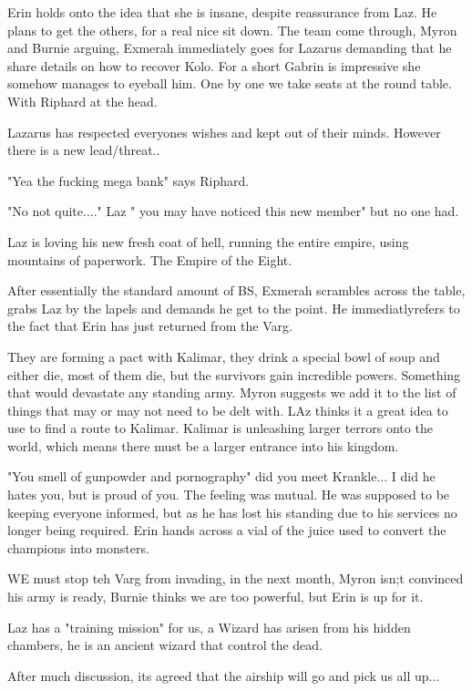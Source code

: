 Erin holds onto the idea that she is insane, despite reassurance from Laz. He plans to get the others, for a real nice sit down. The team come through, Myron and Burnie arguing, Exmerah immediately goes for Lazarus demanding that he share details on how to recover Kolo. For a short Gabrin is impressive she somehow manages to eyeball him. One by one we take seats at the round table. With Riphard at the head.\medskip

Lazarus has respected everyones wishes and kept out of their minds. However there is a new lead/threat..\medskip

"Yea the fucking mega bank" says Riphard.\medskip

"No not quite...." Laz " you may have noticed this new member" but no one had.\medskip

Laz is loving his new fresh coat of hell, running the entire empire, using mountains of paperwork. The Empire of the Eight.\medskip

After essentially the standard amount of BS, Exmerah scrambles across the table, grabs Laz by the lapels and demands he get to the point. He immediatlyrefers to the fact that Erin has just returned from the Varg.\medskip

They are forming a pact with Kalimar, they drink a special bowl of soup and either die, most of them die, but the survivors gain incredible powers. Something that would devastate any standing army. Myron suggests we add it to the list of things that may or may not need to be delt with. LAz thinks it a great idea to use to find a route to Kalimar. Kalimar is unleashing larger terrors onto the world, which means there must be a larger entrance into his kingdom.\medskip

"You smell of gunpowder and pornography" did you meet Krankle... I did he hates you, but is proud of you. The feeling was mutual. He was supposed to be keeping everyone informed, but as he has lost his standing due to his services no longer being required. Erin hands across a vial of the juice used to convert the champions into monsters.\medskip

WE must stop teh Varg from invading, in the next month, Myron isn;t convinced his army is ready, Burnie thinks we are too powerful, but Erin is up for it.\medskip

Laz has a "training mission" for us, a Wizard has arisen from his hidden chambers, he is an ancient wizard that control the dead.\medskip

After much discussion, its agreed that the airship will go and pick us all up...\medskip

